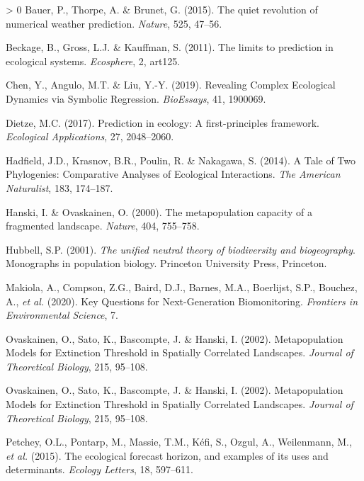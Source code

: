\documentclass[11pt]{article}
\newlength{\cslhangindent}
\newenvironment{CSLReferences}[3] %
 {%
  \setlength{\parindent}{0pt}
  \ifodd #1 \everypar{\setlength{\hangindent}{\cslhangindent}}\ignorespaces\fi
  \ifnum #2 > 0
  \setlength{\parskip}{#2\baselineskip}
  \fi
 }%
 {}
\begin{document}
\hypertarget{refs}{}
\begin{CSLReferences}{1}{0}
\leavevmode\hypertarget{ref-Bauer2015QuiRev}{}%
Bauer, P., Thorpe, A. \& Brunet, G. (2015). The quiet revolution of
numerical weather prediction. \emph{Nature}, 525, 47--56.

\leavevmode\hypertarget{ref-Beckage2011LimPre}{}%
Beckage, B., Gross, L.J. \& Kauffman, S. (2011). The limits to
prediction in ecological systems. \emph{Ecosphere}, 2, art125.

\leavevmode\hypertarget{ref-Chen2019RevCom}{}%
Chen, Y., Angulo, M.T. \& Liu, Y.-Y. (2019). Revealing Complex
Ecological Dynamics via Symbolic Regression. \emph{BioEssays}, 41,
1900069.

\leavevmode\hypertarget{ref-Dietze2017PreEco}{}%
Dietze, M.C. (2017). Prediction in ecology: A first-principles
framework. \emph{Ecological Applications}, 27, 2048--2060.

\leavevmode\hypertarget{ref-Hadfield2014TalTwo}{}%
Hadfield, J.D., Krasnov, B.R., Poulin, R. \& Nakagawa, S. (2014). A Tale
of Two Phylogenies: Comparative Analyses of Ecological Interactions.
\emph{The American Naturalist}, 183, 174--187.

\leavevmode\hypertarget{ref-Hanski2000MetCap}{}%
Hanski, I. \& Ovaskainen, O. (2000). The metapopulation capacity of a
fragmented landscape. \emph{Nature}, 404, 755--758.

\leavevmode\hypertarget{ref-Hubbell2001UniNeu}{}%
Hubbell, S.P. (2001). \emph{The unified neutral theory of biodiversity
and biogeography}. Monographs in population biology. Princeton
University Press, Princeton.

\leavevmode\hypertarget{ref-Makiola2020KeyQue}{}%
Makiola, A., Compson, Z.G., Baird, D.J., Barnes, M.A., Boerlijst, S.P.,
Bouchez, A., \emph{et al.} (2020). Key Questions for Next-Generation
Biomonitoring. \emph{Frontiers in Environmental Science}, 7.

\leavevmode\hypertarget{ref-Ovaskainen2002MetMod}{}%
Ovaskainen, O., Sato, K., Bascompte, J. \& Hanski, I. (2002).
Metapopulation Models for Extinction Threshold in Spatially Correlated
Landscapes. \emph{Journal of Theoretical Biology}, 215, 95--108.

\leavevmode\hypertarget{ref-Ovaskainen2002MetMod}{}%
Ovaskainen, O., Sato, K., Bascompte, J. \& Hanski, I. (2002).
Metapopulation Models for Extinction Threshold in Spatially Correlated
Landscapes. \emph{Journal of Theoretical Biology}, 215, 95--108.

\leavevmode\hypertarget{ref-Petchey2015EcoFor}{}%
Petchey, O.L., Pontarp, M., Massie, T.M., Kéfi, S., Ozgul, A.,
Weilenmann, M., \emph{et al.} (2015). The ecological forecast horizon,
and examples of its uses and determinants. \emph{Ecology Letters}, 18,
597--611.


\end{CSLReferences}
\end{document}
